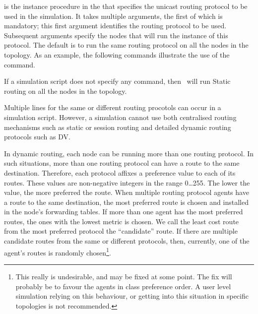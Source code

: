 is the instance procedure in the 
that specifies the unicast routing protocol to be used in the simulation.
It takes multiple arguments, the first of which is mandatory;
this first argument identifies the routing protocol to be used.
Subsequent arguments specify the nodes
that will run the instance of this protocol.
The default is to run the same routing protocol
on all the nodes in the topology.
As an example, the following commands illustrate the use of the
 command.
If a simulation script does not specify any  command,
then \ns\ will run Static routing on all the nodes in the topology.

Multiple  lines for the same or different routing 
procotols can occur in a simulation script.
However, a simulation cannot use both
centralised routing mechanisms such as static or session routing and 
detailed dynamic routing protocols such as DV.

In dynamic routing, each node can be running more than one routing protocol.
In such situations, more than one routing protocol can have a route to the
same destination.
Therefore, each protocol affixes a preference value to each of its routes.
These values are non-negative integers in the range 0\ldots255.
The lower the value, the more preferred the route.
When multiple routing protocol agents have a route to the same destination,
the most preferred route is chosen and
installed in the node's forwarding tables.
If more than one agent has the most preferred routes,
the ones with the lowest metric is chosen.
We call the least cost route from the most preferred protocol the
``candidate'' route.
If there are multiple candidate routes from the same or different protocols,
then, currently,
one of the agent's routes is randomly chosen\footnote{%
This really is undesirable, and may be fixed at some point.
The fix will probably be to favour the agents in class preference order.
A user level simulation relying on this behaviour,
or getting into this situation in specific topologies is
not recommended.}.

